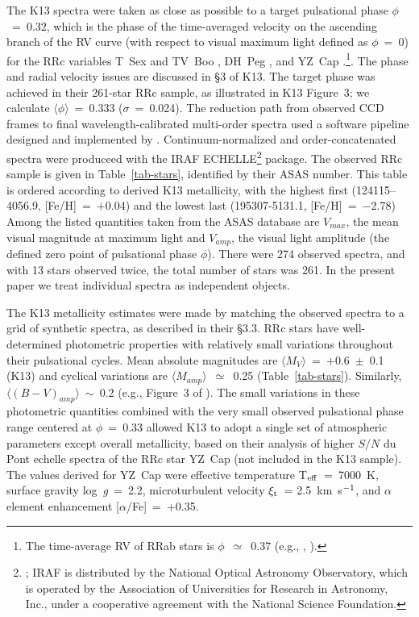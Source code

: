 \documentclass[preprint]{aastex6}
\def\eg{\mbox{e.g.}}
\def\teff{\mbox{T$_{\rm eff}$}}
\def\logg{\mbox{log~{\it g}}}
\def\vmicro{\mbox{$\xi_{\rm t}$}}
\def\kmsec{\mbox{km~s$^{\rm -1}$}}
\begin{document}
The K13 spectra were taken as close as possible to a target pulsational phase
$\phi$~=~0.32, which is the phase of the time-averaged 
velocity on the ascending branch of the RV curve (with respect to visual 
maximum light defined as $\phi$~=~0) for the RRc variables T~Sex and TV~Boo
\citep{liu89}, DH~Peg \citep{jones88a}, and YZ~Cap \citep{govea14}.\footnote{
The time-average RV of RRab stars is $\phi$~$\simeq$~0.37 
(\eg, \citealt{liu91}, \citealt{preston11}).}.
The phase and radial velocity issues are discussed in \S3 of K13.
The target phase was achieved in their 261-star RRc sample, as illustrated in
K13 Figure~3; we calculate $\langle\phi\rangle$~=~0.333 ($\sigma$~=~0.024).
The reduction path from observed CCD frames to final wavelength-calibrated
multi-order spectra used a software pipeline designed 
and implemented by \cite{kelson03}.
Continuum-normalized and order-concatenated spectra were produceed with the
IRAF ECHELLE\footnote{
\cite{tody93}; IRAF is distributed by the National Optical Astronomy 
Observatory, which is operated by the Association of Universities for 
Research in Astronomy, Inc., under a cooperative agreement with the National 
Science Foundation.} 
package.
The observed RRc sample is given in Table~\ref{tab-stars}, identified by their
ASAS number.
This table is ordered according to derived K13 metallicity, with the
highest first (124115--4056.9, [Fe/H]~=~$+$0.04) and the lowest last
(195307-5131.1, [Fe/H]~=~$-$2.78)
Among the listed quantities taken from the ASAS database are 
$V_{max}$, the mean visual magnitude at maximum light and $V_{amp}$, the 
visual light amplitude (the defined zero point of pulsational phase $\phi$). 
There were 274 observed spectra, and with 13 stars observed twice, the
total number of stars was 261.
In the present paper we treat individual spectra as independent objects.

The K13 metallicity estimates were made by matching the observed spectra to
a grid of synthetic spectra, as described in their \S3.3.
RRc stars have well-determined photometric properties with relatively 
small variations throughout their pulsational cycles.  
Mean absolute magnitudes are $\langle M_V\rangle$~=~$+$0.6~$\pm$~0.1 (K13)
and cyclical variations are $\langle M_{amp}\rangle$~$\simeq$~0.25 
(Table~\ref{tab-stars}).
Similarly, $\langle (B-V)_{amp}\rangle$~$\sim$~0.2 (\eg, Figure~3 of
\citealt{layden13}).
The small variations in these photometric quantities combined with the
very small observed pulsational phase range centered at $\phi$~=~0.33
allowed K13 to adopt a single set of atmospheric parameters except
overall metallicity, based on their analysis of higher $S/N$ du Pont echelle
spectra of the RRc star YZ~Cap (not included in the K13 sample).
The values derived for YZ~Cap were effective temperature \teff~=~7000~K, 
surface gravity \logg~=~2.2, microturbulent velocity \vmicro~= 2.5~\kmsec, and
$\alpha$ element enhancement [$\alpha$/Fe]~=~+0.35.  
\end{document}
